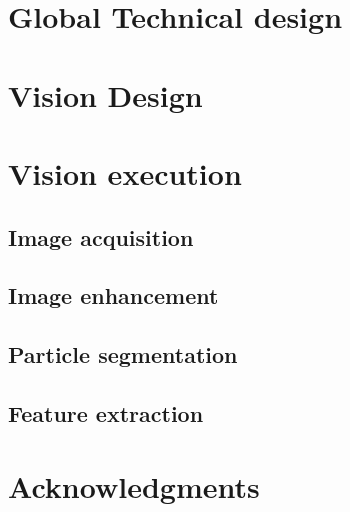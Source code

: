 \documentclass[fleqn,10pt]{SelfArx} %
\begin{document}
\section{Global Technical design}

\lipsum[10] %

\section{Vision Design}

\lipsum[10] %

\section{Vision execution}

\lipsum[11] %

\subsection{Image acquisition}

\lipsum[12] %

\subsection{Image enhancement}

\lipsum[13] %


\subsection{Particle segmentation}

\lipsum[14] %

\subsection{Feature extraction}

\lipsum[15-23] %

\section*{Acknowledgments} %

\end{document}
